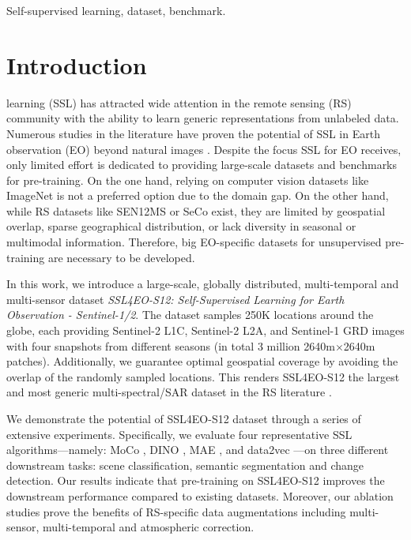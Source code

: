 \documentclass[lettersize,journal]{IEEEtran}
\begin{document}
\begin{IEEEkeywords}
Self-supervised learning, dataset, benchmark.
\end{IEEEkeywords}

\thispagestyle{copyright}

\section{Introduction}

 learning (SSL) has attracted wide attention in the remote sensing (RS) community with the ability to learn generic representations from unlabeled data. Numerous studies in the literature have proven the potential of SSL in Earth observation (EO) beyond natural images \cite{wang2022self1}. Despite the focus SSL for EO receives, only limited effort is dedicated to providing large-scale datasets and benchmarks for pre-training. On the one hand, relying on computer vision datasets like ImageNet \citep{deng2009imagenet} is not a preferred option due to the domain gap. On the other hand, while RS datasets like SEN12MS \cite{Schmitt2019} or SeCo \cite{manas2021seasonal} exist, they are limited by geospatial overlap, sparse geographical distribution, or lack diversity in seasonal or multimodal information. Therefore, big EO-specific datasets for unsupervised pre-training are necessary to be developed.

In this work, we introduce a large-scale, globally distributed, multi-temporal and multi-sensor dataset \textit{SSL4EO-S12: Self-Supervised Learning for Earth Observation - Sentinel-1/2}. The dataset samples 250K locations around the globe, each providing Sentinel-2 L1C, Sentinel-2 L2A, and Sentinel-1 GRD images with four snapshots from different seasons (in total 3 million 2640m$\times$2640m patches). Additionally, we guarantee optimal geospatial coverage by avoiding the overlap of the randomly sampled locations. This renders SSL4EO-S12 the largest and most generic multi-spectral/SAR dataset in the RS literature \cite{xiong2022earthnets}.

We demonstrate the potential of SSL4EO-S12 dataset through a series of extensive experiments. Specifically, we evaluate four representative SSL algorithms---namely: MoCo \cite{he2020momentum}, DINO \cite{caron2021emerging}, MAE \cite{he2021masked}, and data2vec \cite{baevski2022data2vec}---on three different downstream tasks: scene classification, semantic segmentation and change detection. Our results indicate that pre-training on SSL4EO-S12 improves the downstream performance compared to existing datasets. Moreover, our ablation studies prove the benefits of RS-specific data augmentations including multi-sensor, multi-temporal and atmospheric correction.
\end{document}
